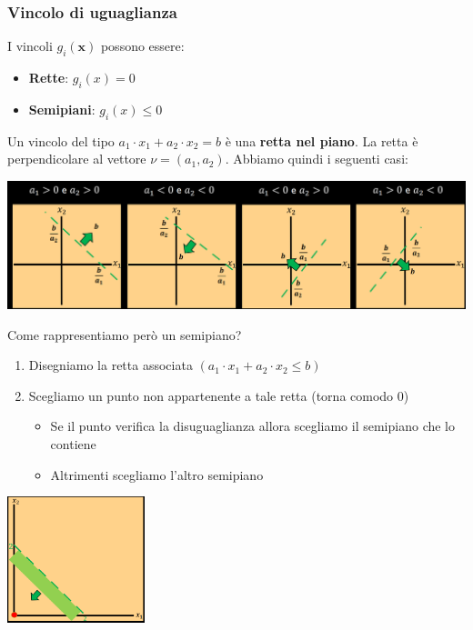 \documentclass[12pt]{article}
\begin{document}
\subsubsection{Vincolo di uguaglianza}
I vincoli $g_i(\textbf{x})$ possono essere:
\begin{itemize}
    \item \textbf{Rette}: $g_i(x) = 0$
    \item \textbf{Semipiani}: $g_i(x) \leq 0$
\end{itemize}
Un vincolo del tipo $a_1 \cdot x_1 + a_2 \cdot x_2 = b$ è una \textbf{retta nel piano}.
La retta è perpendicolare al vettore $\nu = (a_1, a_2)$. Abbiamo quindi i seguenti casi:
\begin{center}
    \includegraphics[width = 1\textwidth]{Images/10.PNG}
\end{center}
Come rappresentiamo però un semipiano?
\begin{enumerate}
    \item Disegniamo la retta associata $(a_1 \cdot x_1 + a_2 \cdot x_2 \leq b)$
    \item Scegliamo un punto non appartenente a tale retta (torna comodo 0)
    \begin{itemize}
        \item Se il punto verifica la disuguaglianza allora scegliamo il semipiano che lo contiene
        \item Altrimenti scegliamo l'altro semipiano
    \end{itemize}
\end{enumerate}
\begin{center}
    \includegraphics[width = 0.30\textwidth]{Images/11.PNG}
\end{center}
\end{document}
